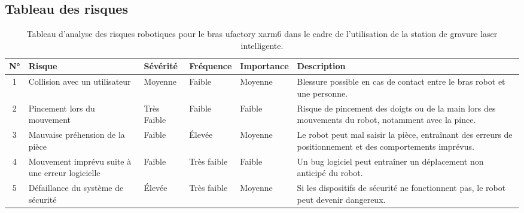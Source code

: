 \subsection{Tableau des risques}

\begin{table}[H]
    \centering
    \renewcommand{\arraystretch}{1.4}
    \begin{tabular}{|c|p{2.5cm}|>{\centering\arraybackslash}m{2cm}|>{\centering\arraybackslash}m{2cm}|>{\centering\arraybackslash}m{2cm}|p{3.5cm}|}
        \hline
        \textbf{N°} & \textbf{Risque}                                 & \textbf{Sévérité}               & \textbf{Fréquence}              & \textbf{Importance}          & \textbf{Description}                                                                                       \\
        \hline
        1           & Collision avec un utilisateur                   & \cellcolor{orange!60}Moyenne    & \cellcolor{yellow!60}Faible     & \cellcolor{orange!60}Moyenne & Blessure possible en cas de contact entre le bras robot et une personne.                                   \\
        \hline
        2           & Pincement lors du mouvement                     & \cellcolor{green!60}Très Faible & \cellcolor{yellow!60}Faible     & \cellcolor{yellow!60}Faible  & Risque de pincement des doigts ou de la main lors des mouvements du robot, notamment avec la pince.        \\
        \hline
        3           & Mauvaise préhension de la pièce                 & \cellcolor{yellow!60}Faible     & \cellcolor{red!60}Élevée        & \cellcolor{orange!60}Moyenne & Le robot peut mal saisir la pièce, entraînant des erreurs de positionnement et des comportements imprévus. \\
        \hline
        4           & Mouvement imprévu suite à une erreur logicielle & \cellcolor{yellow!60}Faible     & \cellcolor{green!60}Très faible & \cellcolor{yellow!60}Faible  & Un bug logiciel peut entraîner un déplacement non anticipé du robot.                                       \\
        \hline
        5           & Défaillance du système de sécurité              & \cellcolor{red!60}Élevée        & \cellcolor{green!60}Très faible & \cellcolor{orange!60}Moyenne & Si les dispositifs de sécurité ne fonctionnent pas, le robot peut devenir dangereux.                       \\
        \hline
    \end{tabular}
    \caption{Tableau d'analyse des risques robotiques pour le bras \gls{ufactory} \gls{xarm6} dans le cadre de l'utilisation de la station de gravure laser intelligente.}
    \label{tab:risques_robotique}
\end{table}

